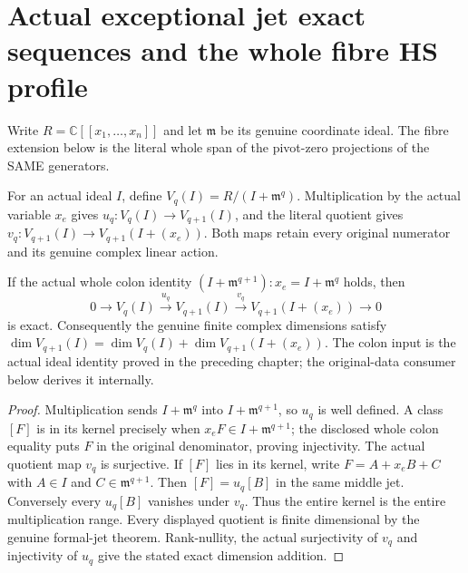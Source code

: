 \section{Actual exceptional jet exact sequences and the whole fibre HS profile}

Write $R=\mathbb C[[x_1,\ldots,x_n]]$ and let $\mathfrak m$ be its
genuine coordinate ideal. The fibre extension below is the literal
whole span of the pivot-zero projections of the SAME generators.

\begin{definition}
\label{hir:actual-exceptional-finite-jet-maps}
\leanok
For an actual ideal $I$, define $V_q(I)=R/(I+\mathfrak m^q)$.
Multiplication by the actual variable $x_e$ gives
$u_q:V_q(I)\to V_{q+1}(I)$, and the literal quotient gives
$v_q:V_{q+1}(I)\to V_{q+1}(I+(x_e))$.
Both maps retain every original numerator and its genuine complex
linear action.
\end{definition}

\begin{theorem}
\label{hir:actual-exceptional-jet-exact-sequence-rank}
\leanok
If the actual whole colon identity
$(I+\mathfrak m^{q+1}):x_e=I+\mathfrak m^q$ holds, then
\[
0\longrightarrow V_q(I)\xrightarrow{u_q}V_{q+1}(I)
\xrightarrow{v_q}V_{q+1}(I+(x_e))\longrightarrow0
\]
is exact. Consequently the genuine finite complex dimensions satisfy
$\dim V_{q+1}(I)=\dim V_q(I)+\dim V_{q+1}(I+(x_e))$.
The colon input is the actual ideal identity proved in the preceding
chapter; the original-data consumer below derives it internally.
\end{theorem}
\begin{proof}
Multiplication sends $I+\mathfrak m^q$ into
$I+\mathfrak m^{q+1}$, so $u_q$ is well defined. A class $[F]$ is in
its kernel precisely when $x_eF\in I+\mathfrak m^{q+1}$; the disclosed
whole colon equality puts $F$ in the original denominator, proving
injectivity. The actual quotient map $v_q$ is surjective. If $[F]$
lies in its kernel, write $F=A+x_eB+C$ with $A\in I$ and
$C\in\mathfrak m^{q+1}$. Then $[F]=u_q[B]$ in the same middle jet.
Conversely every $u_q[B]$ vanishes under $v_q$. Thus the entire kernel
is the entire multiplication range. Every displayed quotient is
finite dimensional by the genuine formal-jet theorem. Rank-nullity,
the actual surjectivity of $v_q$ and injectivity of $u_q$ give the
stated exact dimension addition.
\end{proof}

